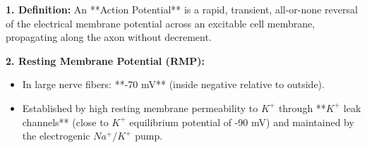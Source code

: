\documentclass[11pt,a4paper]{article}
\begin{document}
\begin{ansbox}
\textbf{1. Definition:}
An **Action Potential** is a rapid, transient, all-or-none reversal of the electrical membrane potential across an excitable cell membrane, propagating along the axon without decrement.

\textbf{2. Resting Membrane Potential (RMP):}
\begin{itemize}[leftmargin=*]
    \item In large nerve fibers: **-70 mV** (inside negative relative to outside).
    \item Established by high resting membrane permeability to $K^+$ through **$K^+$ leak channels** (close to $K^+$ equilibrium potential of -90 mV) and maintained by the electrogenic $Na^+/K^+$ pump.
\end{itemize}


\end{ansbox}
\end{document}
